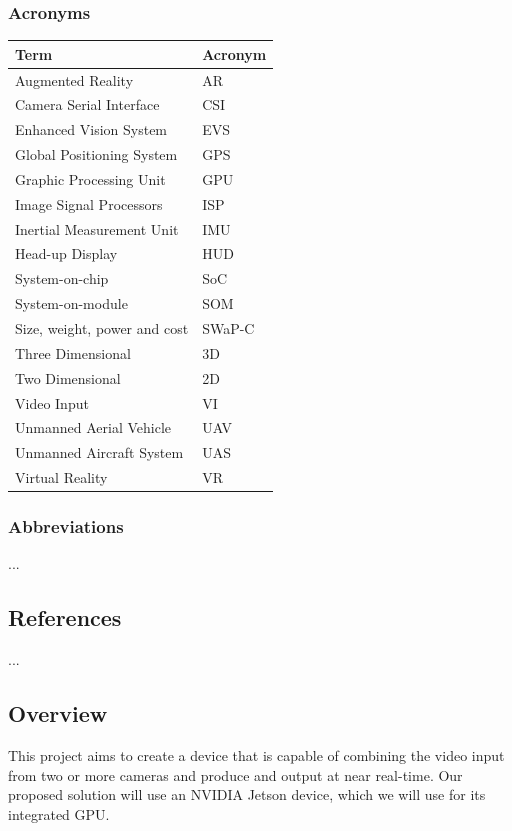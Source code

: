 \documentclass[letterpaper,10pt,serif,draftclsnofoot,onecolumn,compsoc,titlepage]{IEEEtran}
\begin{document}
\subsubsection{Acronyms}

\begin{tabular}{|l|l|}
\hline
\textbf{Term} & \textbf{Acronym}\\
\hline
Augmented Reality & AR\\
\hline
Camera Serial Interface & CSI\\
\hline
Enhanced Vision System & EVS\\
\hline
Global Positioning System & GPS\\
\hline
Graphic Processing Unit & GPU\\
\hline
Image Signal Processors & ISP\\
\hline
Inertial Measurement Unit & IMU\\
\hline
Head-up Display & HUD\\
\hline
System-on-chip & SoC\\
\hline
System-on-module & SOM\\
\hline
Size, weight, power and cost & SWaP-C\\
\hline
Three Dimensional & 3D\\
\hline
Two Dimensional & 2D\\
\hline
Video Input & VI\\
\hline
Unmanned Aerial Vehicle & UAV\\
\hline
Unmanned Aircraft System & UAS\\
\hline
Virtual Reality & VR\\
\hline
\end{tabular}

\subsubsection{Abbreviations}

...

\subsection{References}

...

\subsection{Overview}

This project aims to create a device that is capable of combining the video input from 
two or more cameras and produce and output at near real-time. Our proposed solution 
will use an NVIDIA Jetson device, which we will use for its integrated GPU.\\
\end{document}
